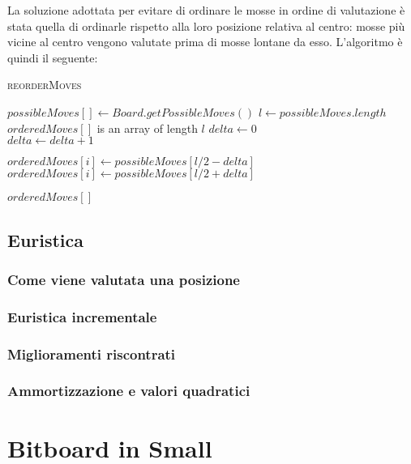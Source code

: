 \documentclass[a4paper]{article}
\begin{document}
La soluzione adottata per evitare di ordinare le mosse in ordine di valutazione
è stata quella di ordinarle rispetto alla loro posizione relativa al centro: 
mosse più vicine al centro vengono valutate prima di mosse lontane da esso.
L'algoritmo è quindi il seguente:

\begin{algorithm}
  \caption{\textsc{reorderMoves}}
 \begin{algorithmic}
   \State $possibleMoves[] \gets Board.getPossibleMoves()$
     \State $l \gets possibleMoves.length$
     \State $orderedMoves[]$ is an array of length $l$
     \State $delta \gets 0$
     \\
         \State $delta \gets delta + 1$

         \State $orderedMoves[i] \gets possibleMoves[l / 2 - delta]$
       \Else
         \State $orderedMoves[i] \gets possibleMoves[l / 2 + delta]$
       \EndIf
     \EndFor

     \State \Return $orderedMoves[]$
   \EndFunction
 \end{algorithmic} 
\end{algorithm}

\subsection{Euristica}
\subsubsection{Come viene valutata una posizione}
\subsubsection{Euristica incrementale}
\subsubsection{Miglioramenti riscontrati}
\subsubsection{Ammortizzazione e valori quadratici}

\section{Bitboard in Small}
\label{sec_bitboard}
\end{document}
